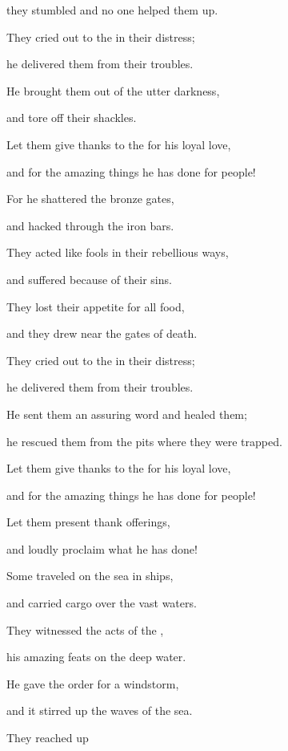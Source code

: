 {\par }{\Q they stumbled
and no
one helped them up.
\par }{\Q {}They cried
out to
the
{}
in their distress;
\par }{\Q he delivered
them
from their troubles.
\par }{\Q {}He brought
them out
of the utter darkness,
\par }{\Q and tore off
their shackles.
\par }{\Q {}Let them give thanks
to the
{}
for his loyal love,
\par }{\Q and for the amazing
things he has done for people!
\par }{\Q {}For
he shattered
the bronze
gates,
\par }{\Q and hacked
through the iron
bars.
\par }{\Q {}They acted like fools
in their rebellious
ways,
\par }{\Q and suffered
because of their sins.
\par }{\Q {}They lost
their appetite
for all
food,
\par }{\Q and they drew near
the gates
of death.
\par }{\Q {}They cried
out to
the
{}
in their distress;
\par }{\Q he delivered
them
from their troubles.
\par }{\Q {}He sent
them an assuring word
and healed
them;
\par }{\Q he rescued
them from the pits where they were trapped.
\par }{\Q {}Let them give thanks
to the
{}
for his loyal love,
\par }{\Q and for the amazing
things he has done for people!
\par }{\Q {}Let them present thank
offerings,
\par }{\Q and loudly
proclaim
what he has done!
\par }{\Q Some traveled
on the sea
in ships,
\par }{\Q and carried
cargo
over the vast
waters.
\par }{\Q {}They
witnessed
the acts
of the {},
\par }{\Q his amazing
feats on the deep water.
\par }{\Q {}He gave the order
for a windstorm,
\par }{\Q and it stirred up
the waves of the sea.
\par }{\Q {}They reached up
}

